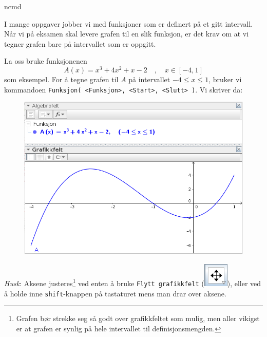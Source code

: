 




\newpage

{ncmd}
\setlength{\cftbeforesecskip}{20 pt}

I mange oppgaver jobber vi med funksjoner som er definert på et gitt intervall. Når vi på eksamen skal levere grafen til en slik funksjon, er det krav om at vi tegner grafen bare på intervallet som er oppgitt.\vsk

La oss bruke funksjonenen
\[ A(x)=x^3+4x^2+x-2\quad,\quad x\in[-4, 1] \]
som eksempel. For å tegne grafen til $ A $ på intervallet $ {-4\leq x \leq 1} $, bruker vi kommandoen \texttt{Funksjon( <Funksjon>, <Start>, <Slutt> )}. Vi skriver da:
\begin{figure}[H]
	\centering
	\includegraphics[scale=0.5]{fig/funk}
\end{figure}
\textsl{Husk}: Aksene justeres\footnote{Grafen bør strekke seg så godt over grafikkfeltet som mulig, men aller vikigst er at grafen er synlig på hele intervallet til definisjonsmengden.} ved enten å bruke {\tt Flytt grafikkfelt} \big(\;\includegraphics[scale=0.25]{fig/flytt}\;\big), eller ved å holde inne {\tt shift}-knappen på tastaturet mens man drar over aksene. 
